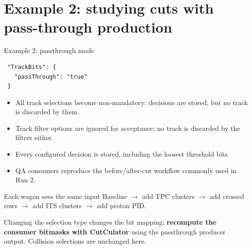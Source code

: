 \section{Example 2: studying cuts with pass-through production}

\begin{frame}[fragile]{Example 2: passthrough mode}
 \footnotesize
 \begin{lstlisting}
 "TrackBits": {
   "passThrough": "true"
 }
 \end{lstlisting}
 \begin{itemize}
 \item All track selections become non-mandatory: decisions are stored, but no track is discarded by them.
 \item Track filter options are ignored for acceptance; no track is discarded by the filters either.
 \item Every configured decision is stored, including the loosest threshold bits.
 \item QA consumers reproduce the before/after-cut workflow commonly used in Run 2.
 \end{itemize}
 \begin{block}{Each wagon sees the same input}
 Baseline $\to$ add TPC clusters $\to$ add crossed rows $\to$ add ITS clusters $\to$ add proton PID.
 \end{block}
 \small Changing the selection type changes the bit mapping: \textbf{recompute the consumer bitmasks with CutCulator} using the passthrough producer output. Collision selections are unchanged here.
\end{frame}

